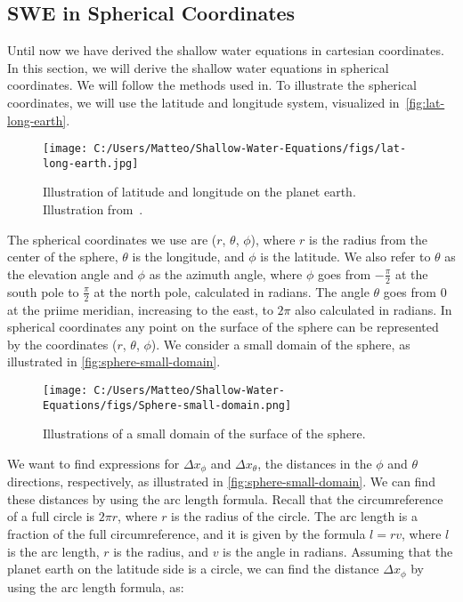 \subsection{SWE in Spherical Coordinates}
Until now we have derived the shallow water equations in cartesian coordinates.
In this section, we will derive the shallow water equations in spherical coordinates.
We will follow the methods used in.
To illustrate the spherical coordinates, we will use the latitude and longitude system, visualized in~\autoref{fig:lat-long-earth}.

\begin{figure}[H]
    \centering
    \texttt{[image: C:/Users/Matteo/Shallow-Water-Equations/figs/lat-long-earth.jpg]}
    \caption{Illustration of latitude and longitude on the planet earth.
    Illustration from~\cite{lat-long-earth}.}\label{fig:lat-long-earth}
\end{figure}
The spherical coordinates we use are ($r$, $\theta$, $\phi$), where $r$ is the radius from the center of the sphere, $\theta$ is the longitude, and $\phi$ is the latitude.
We also refer to $\theta$ as the elevation angle and $\phi$ as the azimuth angle, where $\phi$ goes from $-\frac{\pi}{2}$ at the south pole to $\frac{\pi}{2}$ at the north pole, calculated in radians.
The angle $\theta$ goes from $0$ at the priime meridian, increasing to the east, to $2\pi$ also calculated in radians.
In spherical coordinates any point on the surface of the sphere can be represented by the coordinates ($r$, $\theta$, $\phi$).
We consider a small domain of the sphere, as illustrated in \autoref{fig:sphere-small-domain}.
\begin{figure}[H]
    \centering
    \texttt{[image: C:/Users/Matteo/Shallow-Water-Equations/figs/Sphere-small-domain.png]}
    \caption{Illustrations of a small domain of the surface of the sphere.}\label{fig:sphere-small-domain}
\end{figure}
We want to find expressions for $\Delta x_{\phi}$ and $\Delta x_{\theta}$, the distances in the $\phi$ and $\theta$ directions, respectively, as illustrated in \autoref{fig:sphere-small-domain}.
We can find these distances by using the arc length formula.
Recall that the circumreference of a full circle is $2\pi r$, where $r$ is the radius of the circle.
The arc length is a fraction of the full circumreference, and it is given by the formula $l = r v$, where $l$ is the arc length, $r$ is the radius, and $v$ is the angle in radians.
Assuming that the planet earth on the latitude side is a circle, we can find the distance $\Delta x_{\phi}$ by using the arc length formula, as:
